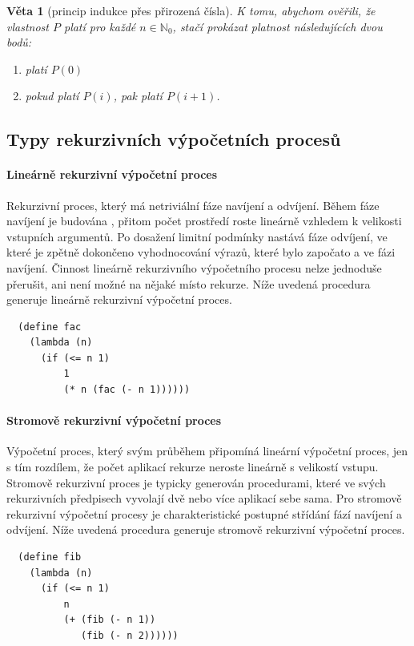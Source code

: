 \documentclass[10pt,a4paper]{article}
\newtheorem{veta}{Věta}
\begin{document}
    \begin{veta}[princip indukce přes přirozená čísla]
      K tomu, abychom ověřili, že vlastnost $P$ platí pro každé $n\in \mathbb{N}_0$, stačí prokázat platnost následujících dvou bodů:
      \begin{enumerate}
        \item platí $P(0)$
        \item pokud platí $P(i)$, pak platí $P(i+1)$.
      \end{enumerate}
    \end{veta}
  \subsection{Typy rekurzivních výpočetních procesů}
    \paragraph{Lineárně rekurzivní výpočetní proces} 
      Rekurzivní proces, který má netriviální fáze navíjení a odvíjení. Během fáze navíjení je budována , přitom počet prostředí roste lineárně vzhledem k velikosti vstupních argumentů. Po dosažení limitní podmínky nastává fáze odvíjení, ve které je zpětně dokončeno vyhodnocování výrazů, které bylo započato a  ve fázi navíjení. Činnost lineárně rekurzivního výpočetního procesu nelze jednoduše přerušit, ani není možné  na nějaké místo rekurze. Níže uvedená procedura generuje lineárně rekurzivní výpočetní proces.
      \begin{verbatim}
  (define fac
    (lambda (n)
      (if (<= n 1)
          1
          (* n (fac (- n 1))))))
      \end{verbatim}
    \paragraph{Stromově rekurzivní výpočetní proces} 
      Výpočetní proces, který svým průběhem připomíná lineární výpočetní proces, jen s tím rozdílem, že počet aplikací rekurze neroste lineárně s velikostí vstupu. Stromově rekurzivní proces je typicky generován procedurami, které ve svých rekurzivních předpisech vyvolají dvě nebo více aplikací sebe sama. Pro stromově rekurzivní výpočetní procesy je charakteristické postupné střídání fází navíjení a odvíjení. Níže uvedená procedura generuje stromově rekurzivní výpočetní proces.
      \begin{verbatim}
  (define fib
    (lambda (n)
      (if (<= n 1)
          n
          (+ (fib (- n 1))
             (fib (- n 2))))))
      \end{verbatim}
\end{document}
